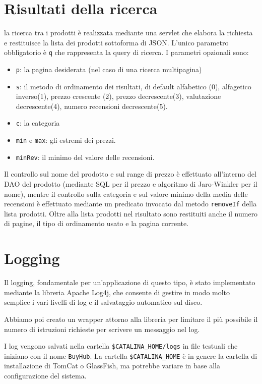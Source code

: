 \chapter{Risultati della ricerca}
la ricerca tra i prodotti è realizzata mediante una servlet che elabora la richiesta e restituisce la lista dei prodotti sottoforma di JSON. L'unico parametro obbligatorio è \texttt{q} che rappresenta la query di ricerca.
I parametri opzionali sono:
\begin{itemize}
  \item \texttt{p}: la pagina desiderata (nel caso di  una ricerca multipagina)
  \item \texttt{s}: il metodo di ordinamento dei risultati, di default alfabetico (0), alfagetico inverso(1), prezzo crescente (2), prezzo decrescente(3), valutazione decrescente(4),  numero recensioni decrescente(5).
  \item \texttt{c}: la categoria
  \item \texttt{min} e \texttt{max}: gli estremi dei prezzi.
  \item \texttt{minRev}: il minimo del valore delle recensioni.
\end{itemize}
Il controllo sul nome del prodotto e sul range di prezzo è effettuato all'interno del DAO del prodotto (mediante SQL per il prezzo e algoritmo di Jaro-Winkler per il nome), mentre il controllo sulla categoria e sul valore minimo della media delle recensioni è effettuato mediante un predicato invocato dal metodo \texttt{removeIf} della lista prodotti.
Oltre alla lista prodotti nel risultato sono restituiti anche il numero di pagine, il tipo di ordinamento usato e la pagina corrente.


\chapter{Logging}
Il logging, fondamentale per un'applicazione di questo tipo, è stato implementato mediante la libreria Apache Log4j, che consente di gestire in modo molto semplice i vari livelli di log e il salvataggio automatico sul disco.

Abbiamo poi creato un wrapper attorno alla libreria per limitare il più possibile il numero di istruzioni richieste per scrivere un messaggio nel log.

I log vengono salvati nella cartella \texttt{\$CATALINA\_HOME/logs} in file testuali che iniziano con il nome \texttt{BuyHub}.
La cartella \texttt{\$CATALINA\_HOME} è in genere la cartella di installazione di TomCat o GlassFish, ma potrebbe variare in base alla configurazione del sistema.

